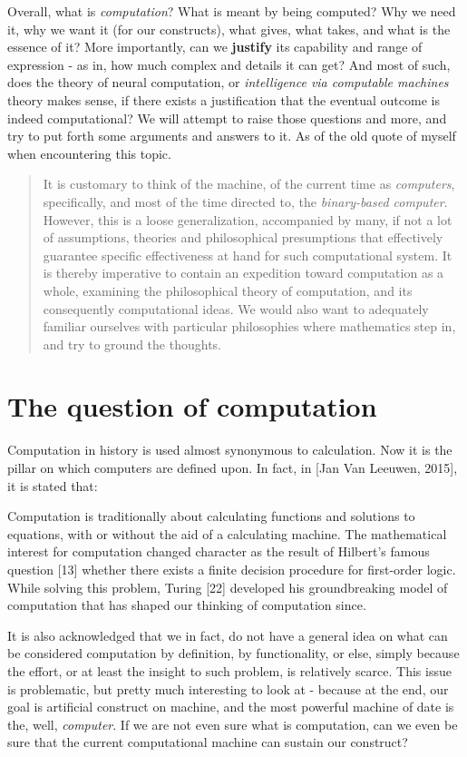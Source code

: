 Overall, what is \textit{computation}? What is meant by being computed? Why we need it, why we want it (for our constructs), what gives, what takes, and what is the essence of it? More importantly, can we \textbf{justify} its capability and range of expression - as in, how much complex and details it can get? And most of such, does the theory of neural computation, or \textit{intelligence via computable machines} theory makes sense, if there exists a justification that the eventual outcome is indeed computational? We will attempt to raise those questions and more, and try to put forth some arguments and answers to it. As of the old quote of myself when encountering this topic. 
\begin{quote}
    It is customary to think of the machine, of the current time as \textit{computers}, specifically, and most of the time directed to, the \textit{binary-based computer}. However, this is a loose generalization, accompanied by many, if not a lot of assumptions, theories and philosophical presumptions that effectively guarantee specific effectiveness at hand for such computational system. It is thereby imperative to contain an expedition toward computation as a whole, examining the philosophical theory of computation, and its consequently computational ideas. We would also want to adequately familiar ourselves with particular philosophies where mathematics step in, and try to ground the thoughts. 
\end{quote}
\section{The question of computation}
Computation in history is used almost synonymous to calculation. Now it is the pillar on which computers are defined upon. In fact, in [Jan Van Leeuwen, 2015], it is stated that: 
\begin{displayquote}
    Computation is traditionally about calculating functions and solutions to equations, with or without the aid of a calculating machine. The mathematical interest for computation changed character as the result of Hilbert's famous question [13] whether there exists a finite decision procedure for first-order logic. While solving this problem, Turing [22] developed his groundbreaking model of computation that has shaped our thinking of computation since.
\end{displayquote}

It is also acknowledged that we in fact, do not have a general idea on what can be considered computation by definition, by functionality, or else, simply because the effort, or at least the insight to such problem, is relatively scarce. This issue is problematic, but pretty much interesting to look at - because at the end, our goal is artificial construct on machine, and the most powerful machine of date is the, well, \textit{computer}. If we are not even sure what is computation, can we even be sure that the current computational machine can sustain our construct? 

